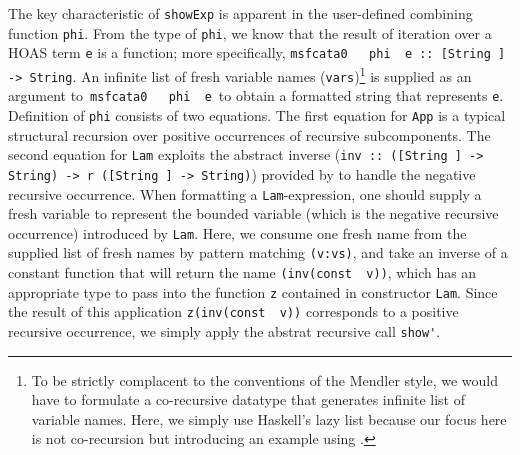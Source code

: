The key characteristic of \lstinline{showExp} is apparent in the user-defined
combining function \lstinline{phi}. From the type of \lstinline{phi}, we know
that the result of iteration over a HOAS term \lstinline{e} is a function;
more specifically,
\lstinline{msfcata0   phi  e :: [String ] -> String}. An infinite list of
fresh variable names (\lstinline{vars})\footnote{
	To be strictly complacent to the conventions of the Mendler style,
	we would have to formulate a co-recursive datatype
	that generates infinite list of variable names.
	Here, we simply use Haskell's lazy list because our focus here is
	not co-recursion but introducing an example using \msfit{}.}
is supplied as an argument to \,\lstinline{msfcata0   phi  e}\, to obtain
a formatted string that represents \lstinline{e}.
Definition of \lstinline{phi} consists of two equations.
The first equation for \lstinline{App} is a typical structural recursion
over positive occurrences of recursive subcomponents. The second equation
for \lstinline{Lam} exploits the abstract inverse
(\lstinline{inv :: ([String ] -> String) -> r ([String ] -> String)})
provided by \msfit{} to handle the negative recursive occurrence.
When formatting a \lstinline{Lam}-expression, one should supply a fresh variable
to represent the bounded variable (which is the negative recursive occurrence)
introduced by \lstinline{Lam}. Here, we consume one fresh name from the supplied
list of fresh names by pattern matching \lstinline{(v:vs)}, and take an inverse
of a constant function that will return the name \lstinline{(inv(const  v))},
which has an appropriate type to pass into the function \lstinline{z} contained
in constructor \lstinline{Lam}. Since the result of this application
\lstinline{z(inv(const  v))} corresponds to a positive recursive occurrence,
we simply apply the abstrat recursive call \lstinline{show'}.
